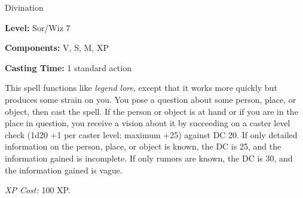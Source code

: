 
Divination

\textbf{Level:} Sor/Wiz 7

\textbf{Components:} V, S, M, XP

\textbf{Casting Time:} 1 standard action

This spell functions like \textit{legend lore}, except that it works more quickly 
but produces some strain on you. You pose a question about some person, place, 
or object, then cast the spell. If the person or object is at hand or if you are 
in the place in question, you receive a vision about it by succeeding on a caster 
level check (1d20 +1 per caster level; maximum +25) against DC 20. If only detailed 
information on the person, place, or object is known, the DC is 25, and the information 
gained is incomplete. If only rumors are known, the DC is 30, and the information 
gained is vague.

\textit{XP Cost:} 100 XP.

